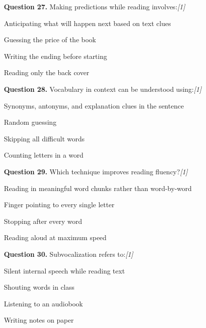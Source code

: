 \documentclass[11pt,a4paper]{article}
\newcommand{\pts}[1]{\hfill   \textit{[#1]}}
\begin{document}
\medskip




\noindent   \textbf{Question 27.} Making predictions while reading involves:\pts{1}

\begin{parts}
  \item Anticipating what will happen next based on text clues
  \item Guessing the price of the book
  \item Writing the ending before starting
  \item Reading only the back cover
\end{parts}

\medskip




\noindent   \textbf{Question 28.} Vocabulary in context can be understood using:\pts{1}

\begin{parts}
  \item Synonyms, antonyms, and explanation clues in the sentence
  \item Random guessing
  \item Skipping all difficult words
  \item Counting letters in a word
\end{parts}

\medskip




\noindent   \textbf{Question 29.} Which technique improves reading fluency?\pts{1}

\begin{parts}
  \item Reading in meaningful word chunks rather than word-by-word
  \item Finger pointing to every single letter
  \item Stopping after every word
  \item Reading aloud at maximum speed
\end{parts}

\medskip




\noindent   \textbf{Question 30.} Subvocalization refers to:\pts{1}

\begin{parts}
  \item Silent internal speech while reading text
  \item Shouting words in class
  \item Listening to an audiobook
  \item Writing notes on paper
\end{parts}
\end{document}
